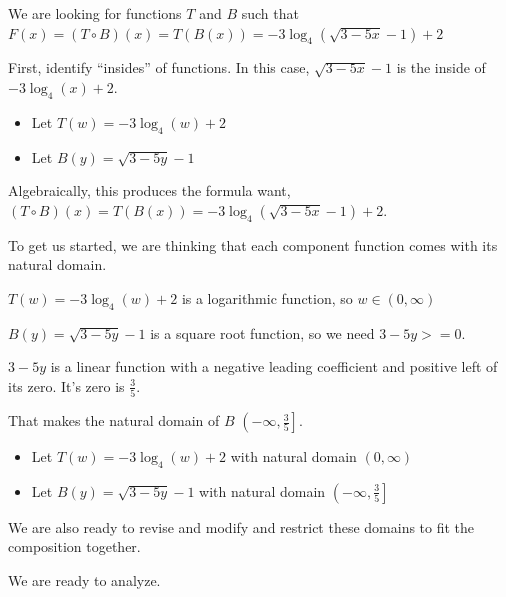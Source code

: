 \documentclass{ximera}
\begin{document}
\begin{idea}

\begin{center}
\end{center}









We are looking for functions $T$ and $B$ such that $F(x) = (T \circ B)(x) = T(B(x)) = -3 \log_4(\sqrt{3 - 5x} - 1) + 2$ 


First, identify ``insides'' of functions.  In this case, $\sqrt{3 - 5x} - 1$ is the inside of $-3 \log_4(x) + 2$. 



\begin{itemize}
\item Let $T(w) = -3 \log_4(w) + 2$ 
\item Let $B(y) = \sqrt{3 - 5y} - 1$ 
\end{itemize}

Algebraically, this produces the formula want,  $(T \circ B)(x) = T(B(x)) = -3 \log_4(\sqrt{3 - 5x} - 1) + 2$.


To get us started, we are thinking that each component function comes with its natural domain. 


$T(w) = -3 \log_4(w) + 2$ is a logarithmic function, so $w \in (0, \infty)$ 


$B(y) = \sqrt{3 - 5y} - 1$ is a square root function, so we need $3 - 5y >= 0$.

$3 - 5y$ is a linear function with a negative leading coefficient and positive left of its zero.  It's zero is $\frac{3}{5}$.

That makes the natural domain of $B$ $\left(-\infty, \frac{3}{5} \right]$. 



\begin{itemize}
\item Let $T(w) = -3 \log_4(w) + 2$ with natural domain $(0, \infty)$\\
\item Let $B(y) = \sqrt{3 - 5y} - 1$ with natural domain $\left(-\infty, \frac{3}{5} \right]$\\
\end{itemize}

We are also ready to revise and modify and restrict these domains to fit the composition together. 




We are ready to analyze. 


\end{idea}
\end{document}
